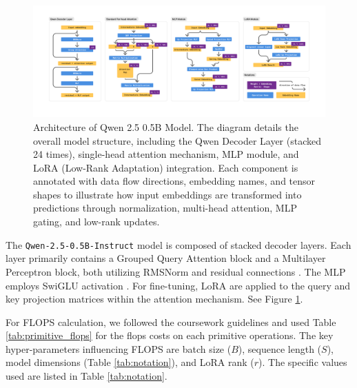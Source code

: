 \documentclass{article}
\begin{document}
\begin{figure}[!htbp]
    \centering
    \includegraphics[width=\linewidth]{M2 Course Work/Images/Qwen_Arch.png}
    \caption{Architecture of Qwen 2.5 0.5B Model. The diagram details the overall model structure, including the Qwen Decoder Layer (stacked 24 times), single-head attention mechanism, MLP module, and LoRA (Low-Rank Adaptation) integration. Each component is annotated with data flow directions, embedding names, and tensor shapes to illustrate how input embeddings are transformed into predictions through normalization, multi-head attention, MLP gating, and low-rank updates.}
    \label{fig:Qwen_Arch}
\end{figure}

The \texttt{Qwen-2.5-0.5B-Instruct} model is composed of stacked decoder layers. Each layer primarily contains a Grouped Query Attention block and a Multilayer Perceptron block, both utilizing RMSNorm \cite{zhang2019rootmeansquarelayer} and residual connections \cite{he2015deepresiduallearningimage}. The MLP employs SwiGLU activation \cite{shazeer2020gluvariantsimprovetransformer}. For fine-tuning, LoRA \cite{hu2021loralowrankadaptationlarge} are applied to the query and key projection matrices within the attention mechanism. See Figure \ref{fig:Qwen_Arch}.

For FLOPS calculation, we followed the coursework guidelines and used Table \ref{tab:primitive_flops} for the flops costs on each primitive operations. The key hyper-parameters influencing FLOPS are batch size ($B$), sequence length ($S$), model dimensions (Table \ref{tab:notation}), and LoRA rank ($r$). The specific values used are listed in Table \ref{tab:notation}.
\end{document}
